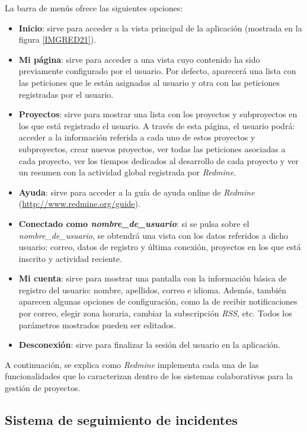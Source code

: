 \documentclass[11pt,a4paper,spanish,twoside]{report}
\begin{document}
La barra de menús ofrece las siguientes opciones:
\begin{itemize}
	\item \textbf{Inicio}: sirve para acceder a la vista principal de la
aplicación (mostrada en la figura \ref{IMGRED21}).
	\item \textbf{Mi página}: sirve para acceder a una vista cuyo contenido ha
sido previamente configurado por el usuario. Por defecto, aparecerá una lista
con las peticiones que le están asignadas al usuario y otra con las peticiones
registradas por el usuario.
	\item \textbf{Proyectos}: sirve para mostrar una lista con los proyectos y
subproyectos en los que está registrado el usuario. A través de esta página,
el usuario podrá: acceder a la información referida a cada uno de estos
proyectos y subproyectos, crear nuevos proyectos, ver todas las peticiones
asociadas a cada proyecto, ver los tiempos dedicados al desarrollo de cada
proyecto y ver un resumen con la actividad global registrada por
\emph{Redmine}.
	\item \textbf{Ayuda}: sirve para acceder a la guía de ayuda online de
\emph{Redmine} (\url{http://www.redmine.org/guide}).
	\item \textbf{Conectado como \emph{nombre\_de\_usuario}}: si se pulsa sobre
el \emph{nombre\_de\_usuario}, se obtendrá una vista con los datos referidos
a dicho usuario: correo, datos de registro y última conexión, proyectos en los
que está inscrito y actividad reciente.
	\item \textbf{Mi cuenta}: sirve para mostrar una pantalla con la información
básica de registro del usuario: nombre, apellidos, correo e idioma. Además,
también aparecen algunas opciones de configuración, como la de recibir
notificaciones por correo, elegir zona horaria, cambiar la subscripción
\emph{RSS}, etc. Todos los parámetros mostrados pueden ser editados.
	\item \textbf{Desconexión}: sirve para finalizar la sesión del usuario en la
aplicación.
\end{itemize}

A continuación, se explica como \emph{Redmine} implementa cada una de las
funcionalidades que lo caracterizan dentro de los sistemas colaborativos para
la gestión de proyectos.

	\subsection{Sistema de seguimiento de incidentes}
        
\end{document}
